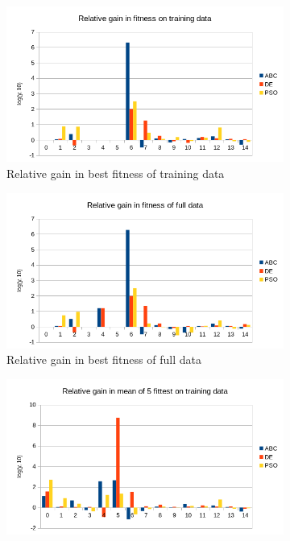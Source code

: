 \begin{figure}
    \centering
    \begin{subfigure}{0.6\textwidth}
    \centering
        \includegraphics[width=0.8\linewidth]{figures/hybrid_phases5_mintrainfitness.png}
        \caption{Relative gain in best fitness of training data}
    \end{subfigure}%
    \begin{subfigure}{0.6\textwidth}
    \centering
        \includegraphics[width=0.8\linewidth]{figures/hybrid_phases5_minfullfitness.png}
        \caption{Relative gain in best fitness of full data}
    \end{subfigure}
        \begin{subfigure}{0.6\textwidth}
    \centering
        \includegraphics[width=0.8\linewidth]{figures/hybrid_phases5_meantrainfitness.png}

\end{subfigure}
\end{figure}

